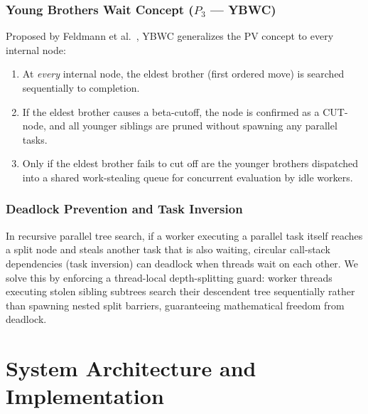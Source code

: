 \documentclass[11pt,a4paper]{article}
\begin{document}
\subsubsection{Young Brothers Wait Concept ($P_3$ --- YBWC)}
Proposed by Feldmann et al.~\cite{feldmann1993game}, YBWC generalizes the PV concept to every internal node:
\begin{enumerate}
    \item At \textit{every} internal node, the eldest brother (first ordered move) is searched sequentially to completion.
    \item If the eldest brother causes a beta-cutoff, the node is confirmed as a CUT-node, and all younger siblings are pruned without spawning any parallel tasks.
    \item Only if the eldest brother fails to cut off are the younger brothers dispatched into a shared work-stealing queue for concurrent evaluation by idle workers.
\end{enumerate}

\subsubsection{Deadlock Prevention and Task Inversion}
In recursive parallel tree search, if a worker executing a parallel task itself reaches a split node and steals another task that is also waiting, circular call-stack dependencies (task inversion) can deadlock when threads wait on each other. We solve this by enforcing a thread-local depth-splitting guard: worker threads executing stolen sibling subtrees search their descendent tree sequentially rather than spawning nested split barriers, guaranteeing mathematical freedom from deadlock.

\section{System Architecture and Implementation}
\label{sec:architecture}
\end{document}
